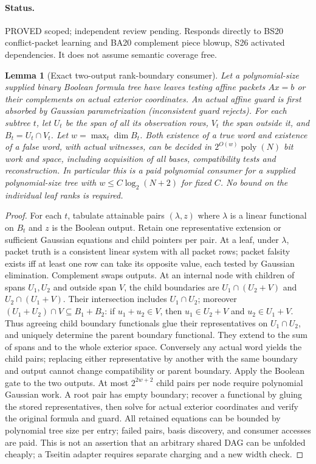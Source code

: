 \documentclass[11pt]{article}
\newtheorem{lemma}[theorem]{Lemma}
\begin{document}
\paragraph{Status.} PROVED scoped; independent review pending. Responds directly to BS20 conflict-packet learning and BA20 complement piece blowup, S26 activated dependencies. It does not assume semantic coverage free.
\begin{lemma}[Exact two-output rank-boundary consumer]\label{lem:gd28-rank}
Let a polynomial-size supplied binary Boolean formula tree have leaves testing affine packets $Ax=b$ or their complements on actual exterior coordinates. An actual affine guard is first absorbed by Gaussian parametrization (inconsistent guard rejects). For each subtree $t$, let $U_t$ be the span of all its observation rows, $V_t$ the span outside it, and $B_t=U_t\cap V_t$. Let $w=\max_t\dim B_t$. Both existence of a true word and existence of a false word, with actual witnesses, can be decided in $2^{O(w)}\operatorname{poly}(N)$ bit work and space, including acquisition of all bases, compatibility tests and reconstruction. In particular this is a paid polynomial consumer for a supplied polynomial-size tree with $w\le C\log_2(N+2)$ for fixed $C$. No bound on the individual leaf ranks is required.
\end{lemma}
\begin{proof}
For each $t$, tabulate attainable pairs $(\lambda,z)$ where $\lambda$ is a linear functional on $B_t$ and $z$ is the Boolean output. Retain one representative extension or sufficient Gaussian equations and child pointers per pair. At a leaf, under $\lambda$, packet truth is a consistent linear system with all packet rows; packet falsity exists iff at least one row can take its opposite value, each tested by Gaussian elimination. Complement swaps outputs. At an internal node with children of spans $U_1,U_2$ and outside span $V$, the child boundaries are $U_1\cap(U_2+V)$ and $U_2\cap(U_1+V)$. Their intersection includes $U_1\cap U_2$; moreover $(U_1+U_2)\cap V\subseteq B_1+B_2$: if $u_1+u_2\in V$, then $u_1\in U_2+V$ and $u_2\in U_1+V$. Thus agreeing child boundary functionals glue their representatives on $U_1\cap U_2$, and uniquely determine the parent boundary functional. They extend to the sum of spans and to the whole exterior space. Conversely any actual word yields the child pairs; replacing either representative by another with the same boundary and output cannot change compatibility or parent boundary. Apply the Boolean gate to the two outputs. At most $2^{2w+2}$ child pairs per node require polynomial Gaussian work. A root pair has empty boundary; recover a functional by gluing the stored representatives, then solve for actual exterior coordinates and verify the original formula and guard. All retained equations can be bounded by polynomial tree size per entry; failed pairs, basis discovery, and consumer accesses are paid. This is not an assertion that an arbitrary shared DAG can be unfolded cheaply; a Tseitin adapter requires separate charging and a new width check.
\end{proof}
\end{document}
